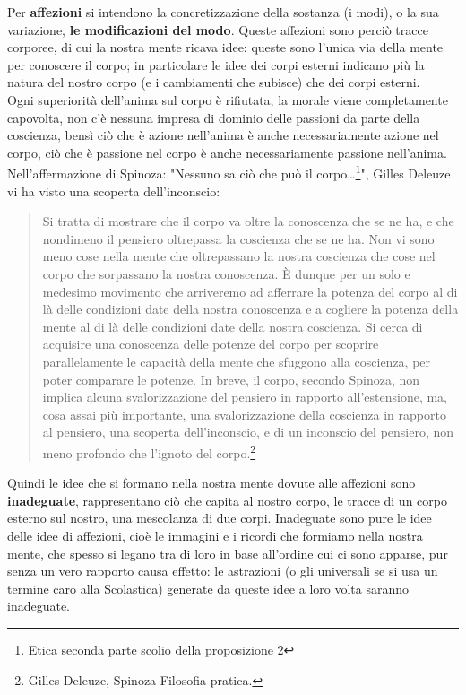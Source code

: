 Per \textbf{affezioni} si intendono la concretizzazione della sostanza (i modi), o la sua variazione, \textbf{le modificazioni del modo}. Queste affezioni sono perciò tracce corporee, di cui la nostra mente ricava idee: queste sono l'unica via della mente per conoscere il corpo; in particolare le idee dei corpi esterni indicano più la natura del nostro corpo (e i cambiamenti che subisce) che dei corpi esterni.\\
Ogni superiorità dell'anima sul corpo è rifiutata, la morale viene completamente capovolta, non c'è nessuna impresa di dominio delle passioni da parte della coscienza, bensì ciò che è azione nell’anima è anche necessariamente azione nel corpo, ciò che è passione nel corpo è anche necessariamente passione nell’anima. Nell'affermazione di Spinoza: "Nessuno sa ciò che può il corpo…\footnote{Etica seconda parte scolio della proposizione 2}", Gilles Deleuze vi ha visto una scoperta dell'inconscio:

\begin{quotation}
	\small Si tratta di mostrare che il corpo va oltre la conoscenza che se ne ha, e che nondimeno il pensiero oltrepassa la coscienza che se ne ha. Non vi sono meno cose nella mente che oltrepassano la nostra coscienza che cose nel corpo che sorpassano la nostra conoscenza. È dunque per un solo e medesimo movimento che arriveremo ad afferrare la potenza del corpo al di là delle condizioni date della nostra conoscenza e a cogliere la potenza della mente al di là delle condizioni date della nostra coscienza. Si cerca di acquisire una conoscenza delle potenze del corpo per scoprire parallelamente le capacità della mente che sfuggono alla coscienza, per poter comparare le potenze. In breve, il corpo, secondo Spinoza, non implica alcuna svalorizzazione del pensiero in rapporto all’estensione, ma, cosa assai più importante, una svalorizzazione della coscienza in rapporto al pensiero, una scoperta dell’inconscio, e di un inconscio del pensiero, non meno profondo che l’ignoto del corpo.\footnote{Gilles Deleuze, Spinoza Filosofia pratica.}
\end{quotation}

Quindi le idee che si formano nella nostra mente dovute alle affezioni sono \textbf{inadeguate}, rappresentano ciò che capita al nostro corpo, le tracce di un corpo esterno sul nostro, una mescolanza di due corpi. Inadeguate sono pure le idee delle idee di affezioni, cioè le immagini e i ricordi che formiamo nella nostra mente, che spesso si legano tra di loro in base all'ordine cui ci sono apparse, pur senza un vero rapporto causa effetto: le astrazioni (o gli universali se si usa un termine caro alla Scolastica) generate da queste idee a loro volta saranno inadeguate.

